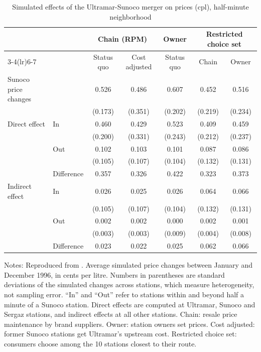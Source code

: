 \begin{table}[htbp]
\centering
\caption{Simulated effects of the Ultramar-Sunoco merger on prices (cpl), half-minute neighborhood}
\label{tab:11-houde-sim}
\begin{threeparttable}
\small
\begin{tabular}{@{}llccccc@{}}
\toprule
 & & \multicolumn{2}{c}{Chain (RPM)} & Owner & \multicolumn{2}{c}{Restricted choice set} \\
\cmidrule(lr){3-4}\cmidrule(lr){6-7}
 & & Status quo & Cost adjusted & Status quo & Chain & Owner \\
\midrule
Sunoco price changes & & 0.526 & 0.486 & 0.607 & 0.452 & 0.516 \\
 & & (0.173) & (0.351) & (0.202) & (0.219) & (0.234) \\
\addlinespace
Direct effect & In & 0.460 & 0.429 & 0.523 & 0.409 & 0.459 \\
 & & (0.200) & (0.331) & (0.243) & (0.212) & (0.237) \\
 & Out & 0.102 & 0.103 & 0.101 & 0.087 & 0.086 \\
 & & (0.105) & (0.107) & (0.104) & (0.132) & (0.131) \\
 & Difference & 0.357 & 0.326 & 0.422 & 0.323 & 0.373 \\
\addlinespace
Indirect effect & In & 0.026 & 0.025 & 0.026 & 0.064 & 0.066 \\
 & & (0.105) & (0.107) & (0.104) & (0.132) & (0.131) \\
 & Out & 0.002 & 0.002 & 0.000 & 0.002 & 0.001 \\
 & & (0.003) & (0.003) & (0.009) & (0.004) & (0.008) \\
 & Difference & 0.023 & 0.022 & 0.025 & 0.062 & 0.066 \\
\bottomrule
\end{tabular}
\begin{tablenotes}[flushleft]
\footnotesize
\item Notes: Reproduced from \citet[Table 10]{Houde2012}. Average simulated price changes between January and
December 1996, in cents per litre. Numbers in parentheses are standard deviations of the simulated changes across
stations, which measure heterogeneity, not sampling error. ``In'' and ``Out'' refer to stations within and beyond half
a minute of a Sunoco station. Direct effects are computed at Ultramar, Sunoco and Sergaz stations, and indirect effects
at all other stations. Chain: resale price maintenance by brand suppliers. Owner: station owners set prices. Cost
adjusted: former Sunoco stations get Ultramar's upstream cost. Restricted choice set: consumers choose among the 10
stations closest to their route.
\end{tablenotes}
\end{threeparttable}
\end{table}

